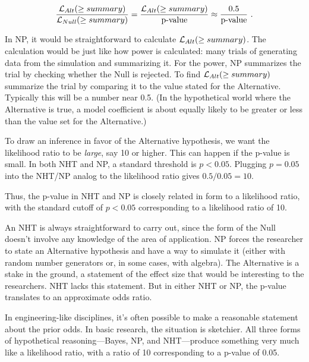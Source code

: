 \documentclass[
  letterpaper,
  DIV=11,
  numbers=noendperiod,
  oneside]{scrartcl}
\begin{document}
\[\frac{{\cal L}_{Alt}(\geq summary)}{{\cal L}_{Null}(\geq summary)} = 
\frac{{\cal L}_{Alt}(\geq summary)}{\text{p-value}} \approx \frac{0.5}{\text{p-value}}\ .\]

In NP, it would be straightforward to calculate
\({\cal L}_{Alt}(\geq summary)\). The calculation would be just like how
power is calculated: many trials of generating data from the simulation
and summarizing it. For the power, NP summarizes the trial by checking
whether the Null is rejected. To find \({\cal L}_{Alt}(\geq summary)\)
summarize the trial by comparing it to the value stated for the
Alternative. Typically this will be a number near 0.5. (In the
hypothetical world where the Alternative is true, a model coefficient is
about equally likely to be greater or less than the value set for the
Alternative.)

To draw an inference in favor of the Alternative hypothesis, we want the
likelihood ratio to be \emph{large}, say 10 or higher. This can happen
if the p-value is small. In both NHT and NP, a standard threshold is
\(p < 0.05\). Plugging \(p=0.05\) into the NHT/NP analog to the
likelihood ratio gives \(0.5/0.05 = 10\).

Thus, the p-value in NHT and NP is closely related in form to a
likelihood ratio, with the standard cutoff of \(p < 0.05\) corresponding
to a likelihood ratio of 10.

An NHT is always straightforward to carry out, since the form of the
Null doesn't involve any knowledge of the area of application. NP forces
the researcher to state an Alternative hypothesis and have a way to
simulate it (either with random number generators or, in some cases,
with algebra). The Alternative is a stake in the ground, a statement of
the effect size that would be interesting to the researchers. NHT lacks
this statement. But in either NHT or NP, the p-value translates to an
approximate odds ratio.

In engineering-like disciplines, it's often possible to make a
reasonable statement about the prior odds. In basic research, the
situation is sketchier. All three forms of hypothetical
reasoning---Bayes, NP, and NHT---produce something very much like a
likelihood ratio, with a ratio of 10 corresponding to a p-value of 0.05.
\end{document}
